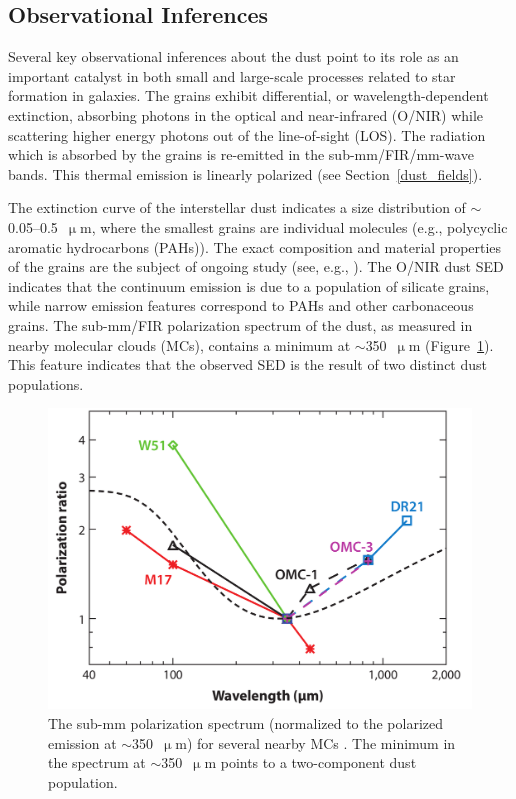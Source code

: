 \subsection{Observational Inferences}

Several key observational inferences about the dust point to its role as an important catalyst in both small and large-scale processes related to star formation in galaxies. The grains exhibit differential, or wavelength-dependent extinction, absorbing photons in the optical and near-infrared (O/NIR) while scattering higher energy photons out of the line-of-sight (LOS). The radiation which is absorbed by the grains is re-emitted in the sub-mm/FIR/mm-wave bands. This thermal emission is linearly polarized (see Section~\ref{dust_fields}).

The extinction curve of the interstellar dust indicates a size distribution of $\sim$0.05--0.5~$\upmu$m, where the smallest grains are individual molecules (e.g., polycyclic aromatic hydrocarbons (PAHs)). The exact composition and material properties of the grains are the subject of ongoing study (see, e.g., \citet{andersson2015interstellar,draine2003interstellar}). The O/NIR dust SED indicates that the continuum emission is due to a population of silicate grains, while narrow emission features correspond to PAHs and other carbonaceous grains. The sub-mm/FIR polarization spectrum of the dust, as measured in nearby molecular clouds (MCs), contains a minimum at $\sim$350~$\upmu$m (Figure~\ref{fig:polspec}). This feature indicates that the observed SED is the result of two distinct dust populations.

\begin{figure}[!htbp]
\centering
\includegraphics[width=\textwidth]{figures/intro/polspec}
\caption[~The measured polarization spectrum of interstellar dust in several nearby MCs.]{The sub-mm polarization spectrum (normalized to the polarized emission at $\sim$350~$\upmu$m) for several nearby MCs \citep{andersson2015interstellar}. The minimum in the spectrum at $\sim$350~$\upmu$m points to a two-component dust population.}
\label{fig:polspec}
\end{figure}

